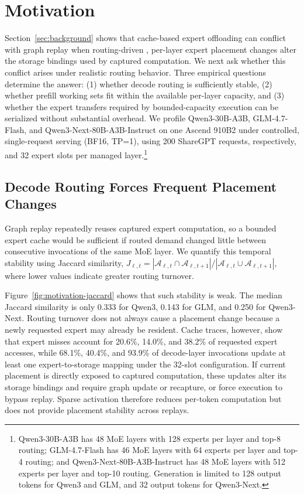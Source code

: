 \section{Motivation}
\label{sec:motivation}

Section~\ref{sec:background} shows that cache-based expert offloading can conflict with graph replay when routing-driven , per-layer expert placement changes alter the storage bindings used by captured computation. 
We next ask whether this conflict arises under realistic routing behavior.
Three empirical questions determine the answer: (1) whether decode routing is sufficiently stable, (2) whether prefill working sets fit within the available per-layer capacity, and (3) whether the expert transfers required by bounded-capacity execution can be serialized without substantial overhead.
We profile Qwen3-30B-A3B, GLM-4.7-Flash, and Qwen3-Next-80B-A3B-Instruct on one Ascend 910B2 under controlled, single-request serving (BF16, TP=1), using 200 ShareGPT requests, respectively, and 32 expert slots per managed layer.\footnote{Qwen3-30B-A3B has 48 MoE layers with 128 experts per layer and top-8 routing; GLM-4.7-Flash has 46 MoE layers with 64 experts per layer and top-4 routing; and Qwen3-Next-80B-A3B-Instruct has 48 MoE layers with 512 experts per layer and top-10 routing. Generation is limited to 128 output tokens for Qwen3 and GLM, and 32 output tokens for Qwen3-Next.}

\subsection{Decode Routing Forces Frequent Placement Changes}

Graph replay repeatedly reuses captured expert computation, so a bounded expert cache would be sufficient if routed demand changed little between consecutive invocations of the same MoE layer. 
We quantify this temporal stability using Jaccard similarity, $J_{\ell,t}=|\mathcal{A}_{\ell,t}\cap\mathcal{A}_{\ell,t+1}|/ |\mathcal{A}_{\ell,t}\cup\mathcal{A}_{\ell,t+1}|$, where lower values indicate greater routing turnover.

Figure~\ref{fig:motivation-jaccard} shows that such stability is weak. The median Jaccard similarity is only 0.333 for Qwen3, 0.143 for GLM, and 0.250 for Qwen3-Next. 
Routing turnover does not always cause a placement change because a newly requested expert may already be resident. 
Cache traces, however, show that expert misses account for 20.6\%, 14.0\%, and 38.2\% of requested expert accesses, while 68.1\%, 40.4\%, and 93.9\% of decode-layer invocations update at least one expert-to-storage mapping under the 32-slot configuration. 
If current placement is directly exposed to captured computation, these updates alter its storage bindings and require graph update or recapture, or force execution to bypass replay.
Sparse activation therefore reduces per-token computation but does not provide placement stability across replays.

